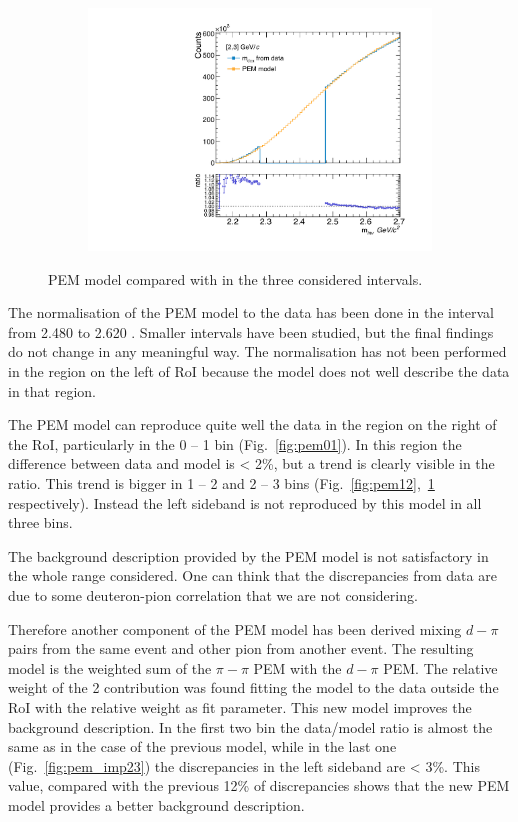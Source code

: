 \begin{figure}
\begin{subfigure}{.33\textwidth}
  \includegraphics[width=\linewidth]{gfx/23}
  \caption{}
  \label{fig:pem23}
\end{subfigure}
\caption{PEM model compared with \minv in the three considered \pt intervals.}
\label{fig:PEM}
\end{figure}

The normalisation of the PEM model to the data has been done in the interval from 2.480 to
2.620 \gevcs. Smaller intervals have been studied, but the final findings do not
change in any meaningful way. The normalisation has not been performed in the region on the left 
of RoI because the model does not well describe the data in that region.

The PEM model can reproduce quite well the data in the region on the right of the RoI,
particularly in the 0 -- 1 \gevc \pt bin (Fig.~\ref{fig:pem01}). In this region the difference between
data and model is < 2\%, but a trend is clearly visible in the ratio.
This trend is bigger in 1 -- 2 \gevc and 2 -- 3 \gevc \pt bins (Fig.~\ref{fig:pem12},~\ref{fig:pem23} respectively).
Instead the left sideband is not reproduced by this model in all three \pt bins.

The background description provided by the PEM model is not satisfactory in the whole \pt range
considered. One can think that the discrepancies from data are due to some deuteron-pion correlation
that we are not considering.

Therefore another component of the PEM model has been derived mixing $d-\pi$ pairs from the
same event and other pion from another event.
The resulting model is the weighted sum of the $\pi-\pi$ PEM with the $d-\pi$ PEM. 
The relative weight of the 2 contribution was found fitting the model to the data outside the RoI
with the relative weight as fit parameter.
This new model improves the background description.
In the first two \pt bin the data/model ratio is almost the same as in the case of the previous model,
while in the last one (Fig.~\ref{fig:pem_imp23}) the discrepancies in the left sideband are < 3\%.
This value, compared with the previous 12\% of discrepancies shows that the new PEM
model provides a better background description.

